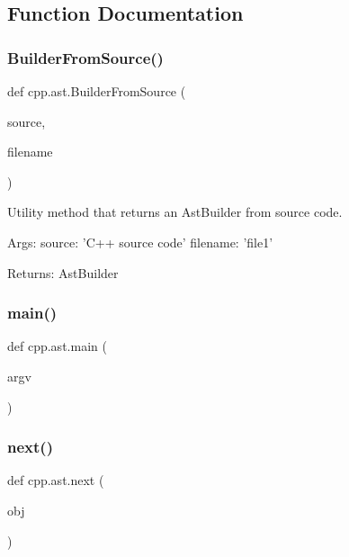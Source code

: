 \subsection{Function Documentation}
\mbox{\label{namespacecpp_1_1ast_a696471f0d7971a0789824803a008cf6b}} 
\subsubsection{\texorpdfstring{BuilderFromSource()}{BuilderFromSource()}}
{\footnotesize\ttfamily def cpp.\+ast.\+Builder\+From\+Source (\begin{DoxyParamCaption}\item[{}]{source,  }\item[{}]{filename }\end{DoxyParamCaption})}

\begin{DoxyVerb}Utility method that returns an AstBuilder from source code.

Args:
  source: 'C++ source code'
  filename: 'file1'

Returns:
  AstBuilder
\end{DoxyVerb}
 \mbox{\label{namespacecpp_1_1ast_acd29cc27c3bff13bf3e055575b8e958a}} 
\subsubsection{\texorpdfstring{main()}{main()}}
{\footnotesize\ttfamily def cpp.\+ast.\+main (\begin{DoxyParamCaption}\item[{}]{argv }\end{DoxyParamCaption})}

\mbox{\label{namespacecpp_1_1ast_a39ad8261fef5e0a7c1c17c510541b66f}} 
\subsubsection{\texorpdfstring{next()}{next()}}
{\footnotesize\ttfamily def cpp.\+ast.\+next (\begin{DoxyParamCaption}\item[{}]{obj }\end{DoxyParamCaption})}

